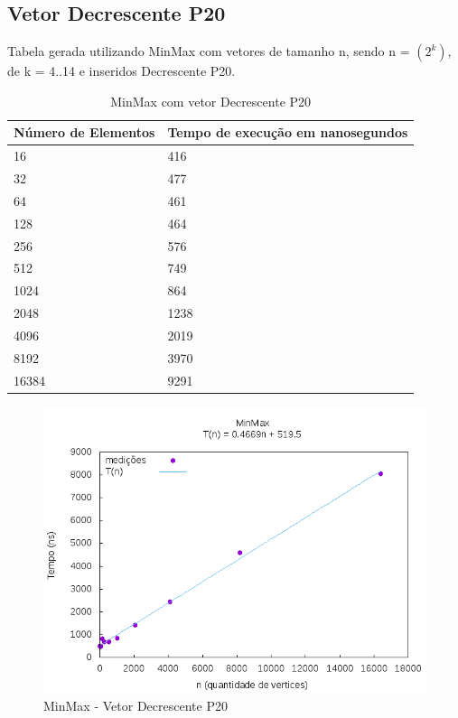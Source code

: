 \documentclass[12pt,a4paper,twoside]{report}
\begin{document}
\subsection{Vetor Decrescente P20}
Tabela gerada utilizando MinMax com vetores de tamanho n, sendo n = $(2^k)$, de k = 4..14 e inseridos Decrescente P20.
\begin{table}[H]
\centering
\caption{MinMax com vetor Decrescente P20}
\label{my-label}
\begin{tabular}{|l|l|}
\hline
\multicolumn{1}{|c|}{\textbf{Número de Elementos}} & \multicolumn{1}{c|}{\textbf{Tempo de execução em nanosegundos}} \\ \hline
16 & 416 \\ \hline
32 & 477 \\ \hline
64 & 461 \\ \hline
128 & 464 \\ \hline
256 & 576 \\ \hline
512 & 749 \\ \hline
1024 & 864 \\ \hline
2048 & 1238 \\ \hline
4096 & 2019 \\ \hline
8192 & 3970 \\ \hline
16384 & 9291 \\ \hline
\end{tabular}
\end{table}

\begin{figure}[H]
    \centering
    \includegraphics[width=0.7\linewidth]{graficos/Min Max/Decrescente P20/MinMax.png}
  \caption{MinMax - Vetor Decrescente P20}
\end{figure}
\end{document}
